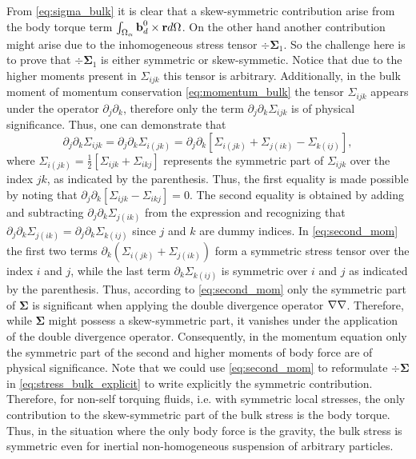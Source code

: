 From \ref{eq:sigma_bulk} it is clear that a skew-symmetric contribution arise from the body torque term $\int_{\Omega_\alpha} \textbf{b}_d^0 \times \textbf{r} d\Omega$. 
On the other hand another contribution might arise due to the inhomogeneous stress tensor $\div \bm\Sigma_1$. 
So the challenge here is to prove that  $\div \bm\Sigma_1$ is either symmetric or skew-symmetic. 
Notice that due to the higher moments present in $\Sigma_{ijk}$ this tensor is arbitrary. 
Additionally, in the bulk moment of momentum conservation \eqref{eq:momentum_bulk} the tensor $\Sigma_{ijk}$ appears under the operator $\partial_j \partial_k$, therefore only the term $\partial_j \partial_k \Sigma_{ijk}$ is of physical significance. 
Thus, one can demonstrate that \citep{lhuillier1996contribution}
\begin{equation}
    \partial_j \partial_k \Sigma_{ijk}
    = \partial_j \partial_k \Sigma_{i(jk)}
    =
    \partial_j \partial_k \left[
        \Sigma_{i(jk)}
        + \Sigma_{j(ik)}
        - \Sigma_{k(ij)}
    \right],
    \label{eq:second_mom}
\end{equation}
where $\Sigma_{i(jk)} = \frac{1}{2}[\Sigma_{ijk} + \Sigma_{ikj}]$ represents the symmetric part of $\Sigma_{ijk}$ over the index $jk$, as indicated by the parenthesis. 
Thus, the first equality is made possible by noting that $\partial_j \partial_k [\Sigma_{ijk} - \Sigma_{ikj}] = 0$.
The second equality is obtained by adding and subtracting $\partial_j \partial_k \Sigma_{j(ik)}$ from the expression and recognizing that $\partial_j \partial_k \Sigma_{j(ik)} = \partial_j \partial_k \Sigma_{k(ij)}$ since $j$ and $k$ are dummy indices. 
In \ref{eq:second_mom} the first two terms $\partial_k(\Sigma_{i(jk)} + \Sigma_{j(ik)})$ form a symmetric stress tensor over the index $i$ and $j$, while the last term $\partial_k\Sigma_{k(ij)}$ is symmetric over $i$ and $j$ as indicated by the parenthesis. 
Thus, according to \ref{eq:second_mom} only the symmetric part of $\bm\Sigma$ is significant when applying the double divergence operator $\mathbf{\nabla}\mathbf{\nabla}$. 
Therefore, while $\bm\Sigma$ might possess a skew-symmetric part, it vanishes under the application of the double divergence operator. 
Consequently, in the momentum equation only the symmetric part of the second and higher moments of body force are of physical significance.
Note that we could use \ref{eq:second_mom} to reformulate $\div\bm\Sigma$ in \ref{eq:stress_bulk_explicit} to write explicitly the symmetric contribution. 
Therefore, for non-self torquing fluids, i.e. with symmetric local stresses,  the only contribution to the skew-symmetric part of the bulk stress is the body torque.
Thus, in the situation where the only body force is the gravity, the bulk stress is symmetric even for inertial non-homogeneous suspension of arbitrary particles. 
